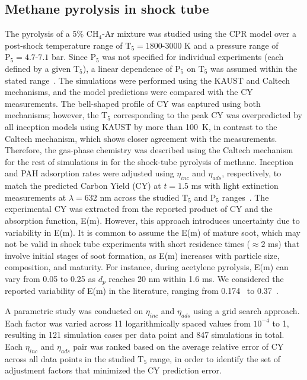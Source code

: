 \subsection{Methane pyrolysis in shock tube}

The pyrolysis of a 5\% $\mathrm{CH_4}$-Ar mixture was studied using the CPR model over a post-shock temperature range of $\mathrm{T_5} = 1800$-$3000$ K and a pressure range of $\mathrm{P_5} = 4.7$-$7.1$ bar. Since $\mathrm{P_5}$ was not specified for individual experiments (each defined by a given $\mathrm{T_5}$), a linear dependence of $\mathrm{P_5}$ on $\mathrm{T_5}$ was assumed within the stated range~\citep{agafonov2016unified}. The simulations were performed using the KAUST and Caltech mechanisms, and the model predictions were compared with the CY measurements. The bell-shaped profile of CY was captured using both mechanisms; however, the $\mathrm{T_5}$ corresponding to the peak CY was overpredicted by all inception models using KAUST by more than 100~K, in contrast to the Caltech mechanism, which shows closer agreement with the measurements. Therefore, the gas-phase chemistry was described using the Caltech mechanism for the rest of simulations in for the shock-tube pyrolysis of methane. Inception and PAH adsorption rates were adjusted using $\eta_{inc}$ and $\eta_{ads}$, respectively, to match the predicted Carbon Yield (CY) at $t = 1.5$ ms with light extinction measurements at $\lambda = 632$ nm across the studied $\mathrm{T_5}$ and $\mathrm{P_5}$ ranges~\citep{agafonov2016unified}. The experimental CY was extracted from the reported product of CY and the absorption function, E(m). However, this approach introduces uncertainty due to variability in E(m). It is common to assume the E(m) of mature soot, which may not be valid in shock tube experiments with short residence times ($\approx 2$ ms) that involve initial stages of soot formation, as E(m) increases with particle size, composition, and maturity. For instance, during acetylene pyrolysis, E(m) can vary from 0.05 to 0.25 as $d_p$ reaches 20 nm within 1.6 ms. We considered the reported variability of E(m) in the literature, ranging from 0.174~\citep{lee1981optical} to 0.37~\citep{agafonov2011soot}.

A parametric study was conducted on $\eta_{inc}$ and $\eta_{ads}$ using a grid search approach. Each factor was varied across 11 logarithmically spaced values from $10^{-4}$ to 1, resulting in 121 simulation cases per data point and 847 simulations in total. Each $\eta_{inc}$ and $\eta_{ads}$ pair was ranked based on the average relative error of CY across all data points in the studied $\mathrm{T_5}$ range, in order to identify the set of adjustment factors that minimized the CY prediction error. 

